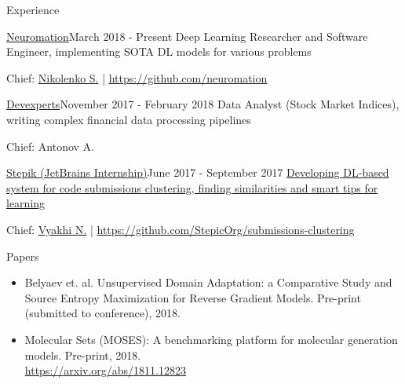 \documentclass{resume} %
\newcommand{\SKIPSM}{\vspace{-0.7\baselineskip}}
\begin{document}
\SKIPSM
\begin{rSection}{Experience}

\begin{rSubsection}{\href{https://neuromation.io}{Neuromation}}{March 2018 - Present}
{Deep Learning Researcher and Software Engineer, implementing SOTA DL models for various problems}{} 
\item[] Chief: \href{https://logic.pdmi.ras.ru/~sergey/}{Nikolenko S.} | \url{https://github.com/neuromation}
\end{rSubsection}

\vspace{-0.9\baselineskip}
\begin{rSubsection}{\href{https://devexperts.com/en/index.html}{Devexperts}}{November 2017 - February 2018}
{Data Analyst (Stock Market Indices), writing complex financial data processing pipelines}{} 
\item[] Chief: Antonov A.
\end{rSubsection}

\vspace{-0.9\baselineskip}
\begin{rSubsection}{\href{http://stepik.org/}{Stepik (JetBrains Internship)}}{June 2017 - September 2017}
{\href{https://jetbrains.ru/students/internship/themes/again/}{Developing DL-based system for code submissions clustering, finding similarities and smart tips for learning}}{} 
\item[] Chief: \href{http://bioinformaticsinstitute.ru/teachers/vyahhi}{Vyakhi N.} | \url{https://github.com/StepicOrg/submissions-clustering}
\end{rSubsection}

\end{rSection}
\vspace{-1.3\baselineskip}
\begin{rSection}{Papers}

\begin{itemize}
    \item Belyaev et. al. Unsupervised Domain Adaptation: a Comparative Study and Source Entropy Maximization for Reverse Gradient Models. Pre-print (submitted to conference), 2018.
    \vspace{-0.5\baselineskip}
    \item Molecular Sets (MOSES): A benchmarking platform for molecular generation models. Pre-print, 2018. \\ \url{https://arxiv.org/abs/1811.12823}
\end{itemize}

\end{rSection}
\end{document}
